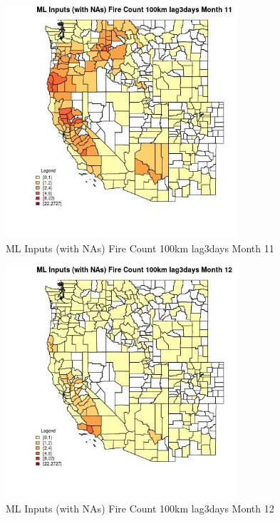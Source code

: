 \begin{figure} 
\centering  
\includegraphics[width=0.77\textwidth]{Code_Outputs/Report_ML_input_PM25_Step4_part_f_de_duplicated_aves_prioritize_24hr_obswNAs_CountyFire_Count_100km_lag3daysmedianMonth11.jpg} 
\caption{\label{fig:Report_ML_input_PM25_Step4_part_f_de_duplicated_aves_prioritize_24hr_obswNAsCountyFire_Count_100km_lag3daysmedianMonth11}ML Inputs (with NAs) Fire Count 100km lag3days Month 11} 
\end{figure} 
 

\begin{figure} 
\centering  
\includegraphics[width=0.77\textwidth]{Code_Outputs/Report_ML_input_PM25_Step4_part_f_de_duplicated_aves_prioritize_24hr_obswNAs_CountyFire_Count_100km_lag3daysmedianMonth12.jpg} 
\caption{\label{fig:Report_ML_input_PM25_Step4_part_f_de_duplicated_aves_prioritize_24hr_obswNAsCountyFire_Count_100km_lag3daysmedianMonth12}ML Inputs (with NAs) Fire Count 100km lag3days Month 12} 
\end{figure} 
 

